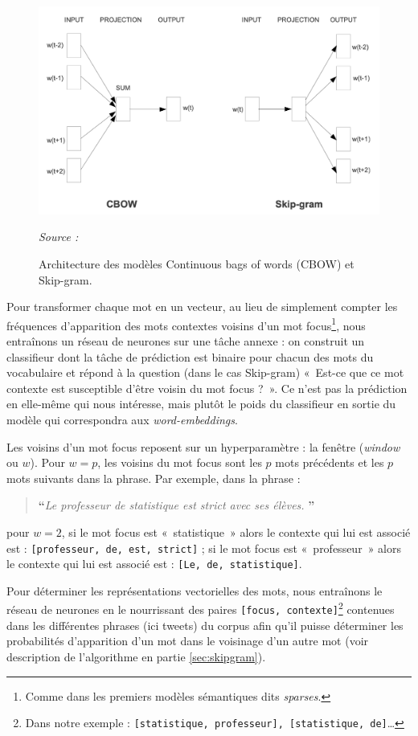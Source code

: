\documentclass[11pt,french,french]{article}
\let\rmarkdownfootnote\footnote%
\def\footnote{\protect\rmarkdownfootnote}
\begin{document}
\begin{figure}[htp]
\centering
\includegraphics[width=.6\textwidth]{img/cbow_skip_gram.png}
\captionsetup{margin=0cm,format=hang,justification=justified}
\caption{Architecture des modèles Continuous bags of words (CBOW) et Skip-gram.}\label{fig:cbowskipgram}
\footnotesize
\emph{Source : \cite{Mikolov}}
\end{figure}

Pour transformer chaque mot en un vecteur, au lieu de simplement compter les fréquences d'apparition des mots contextes voisins d'un mot focus\footnote{Comme dans les premiers modèles sémantiques dits \emph{sparses}.}, nous entraînons un réseau de neurones sur une tâche annexe : on construit un classifieur dont la tâche de prédiction est binaire pour chacun des mots du vocabulaire et répond à la question (dans le cas Skip-gram) «~Est-ce que ce mot contexte est susceptible d'être voisin du mot focus ?~».
Ce n'est pas la prédiction en elle-même qui nous intéresse, mais plutôt le poids du classifieur en sortie du modèle qui correspondra aux \emph{word-embeddings}.

Les voisins d'un mot focus reposent sur un hyperparamètre : la fenêtre (\emph{window} ou \(w\)).
Pour \(w = p\), les voisins du mot focus sont les \(p\) mots précédents et les \(p\) mots suivants dans la phrase. Par exemple, dans la phrase :

\begin{quote}
\LARGE \textbf{``}\normalsize \emph{Le professeur de statistique est strict avec ses élèves.} \LARGE \textbf{''}\normalsize
\end{quote}

pour \(w=2\), si le mot focus est «~statistique~» alors le contexte qui lui est associé est : \texttt{{[}professeur,\ de,\ est,\ strict{]}} ; si le mot focus est «~professeur~» alors le contexte qui lui est associé est : \texttt{{[}Le,\ de,\ statistique{]}}.

Pour déterminer les représentations vectorielles des mots, nous entraînons le réseau de neurones en le nourrissant des paires \texttt{{[}focus,\ contexte{]}}\footnote{Dans notre exemple : \texttt{{[}statistique,\ professeur{]},\ {[}statistique,\ de{]}}\dots} contenues dans les différentes phrases (ici tweets) du corpus afin qu'il puisse déterminer les probabilités d'apparition d'un mot dans le voisinage d'un autre mot (voir description de l'algorithme en partie \ref{sec:skipgram}).
\end{document}
